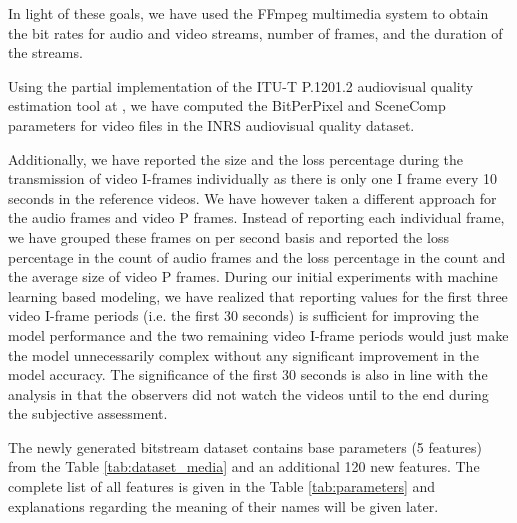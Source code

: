 \documentclass[journal]{IEEEtran}
\begin{document}
In light of these goals, we have used the FFmpeg multimedia system \cite{ffmpeg} to obtain the bit rates for audio and video streams, number of frames, and the duration of the streams.

Using the partial implementation of the ITU-T P.1201.2 audiovisual quality estimation tool at \cite{itut2012P.1201.2_tool}, we have computed the BitPerPixel and SceneComp parameters for video files in the INRS audiovisual quality dataset.

Additionally, we have reported the size and the loss percentage during the transmission of video I-frames individually as there is only one I frame every 10 seconds in the reference videos. We have however taken a different approach for the audio frames and video P frames. Instead of reporting each individual frame, we have grouped these frames on per second basis and reported the loss percentage in the count of audio frames and the loss percentage in the count and the average size of video P frames. During our initial experiments with machine learning based modeling, we have realized that reporting values for the first three video I-frame periods (i.e. the first 30 seconds) is sufficient for improving the model performance and the two remaining video I-frame periods would just make the model unnecessarily complex without any significant improvement in the model accuracy. The significance of the first 30 seconds is also in line with the analysis in \cite{demirbilek2016inrsquality} that the observers did not watch the videos until to the end during the subjective assessment.

The newly generated bitstream dataset contains base parameters (5 features) from the Table \ref{tab:dataset_media} and an additional 120 new features. The complete list of all features is given in the Table \ref{tab:parameters} and explanations regarding the meaning of their names will be given later.
\end{document}
